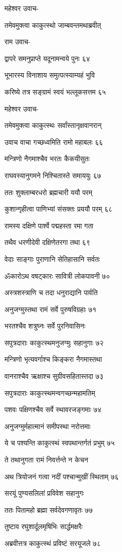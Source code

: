 महेश्वर उवाच-

तमेवमुक्त्वा काकुत्स्थो जाम्बवन्तमथाब्रवीत्

राम उवाच-

द्वापरे समनुप्राप्ते यदूनामन्वये पुनः ६४

भूभारस्य विनाशाय समुत्पत्स्याम्यहं भुवि

करिष्ये तत्र सङ्ग्रामं स्वयं भल्लूकसत्तम ६५

महेश्वर उवाच-

तमेवमुक्त्वा काकुत्स्थः सर्वांस्तानृक्षवानरान्

उवाच वाचा गच्छध्वमिति रामो महाबलः ६६

मन्त्रिणो नैगमाश्चैव भरतः कैकयीसुतः

राघवस्यानुगमने निश्चितास्ते समाययुः ६७

ततः शुक्लाम्बरधरो ब्रह्मचारी ययौ परम्

कुशान्गृहीत्वा पाणिभ्यां संसक्तः प्रययौ परम् ६८

रामस्य दक्षिणे पार्श्वे पद्महस्ता रमा गता

तथैव धरणीदेवी दक्षिणेतरगा तथा ६९

वेदाः साङ्गाः पुराणानि सेतिहासानि सर्वतः

ॐकारोऽथ वषट्कारः सावित्री लोकपावनी ७०

अस्त्रशस्त्राणि च तदा धनुराद्यानि पार्वति

अनुजग्मुस्तथा रामं सर्वे पुरुषविग्रहाः ७१

भरतश्चैव शत्रुघ्नः सर्वे पुरनिवासिनः

सपुत्रदाराः काकुत्स्थमनुजग्मुः सहानुगाः ७२

मन्त्रिणो भृत्यवर्गाश्च किङ्करा नैगमास्तथा

वानराश्चैव ऋक्षाश्च सुग्रीवसहितास्तदा ७३

सपुत्रदाराः काकुत्स्थमन्वगच्छन्महामतिम्

पशवः पक्षिणश्चैव सर्वे स्थावरजङ्गमाः ७४

अनुजग्मुर्महात्मानं समीपस्था नरोत्तमाः

ये च पश्यन्ति काकुत्स्थं स्वपथान्तर्गतं प्रभुम् ७५

ते तथानुगता रामं निवर्त्तन्ते न केचन

अथ त्रियोजनं गत्वा नदीं पश्चान्मुखीं स्थिताम् ७६

सरयूं पुण्यसलिलां प्रविवेश सहानुगः

ततः पितामहो ब्रह्मा सर्वदेवगणावृतः ७७

तुष्टाव रघुशार्दूलमृषिभिः सार्द्धमक्षरैः

अब्रवीत्तत्र काकुत्स्थं प्रविष्टं सरयूजले ७८

